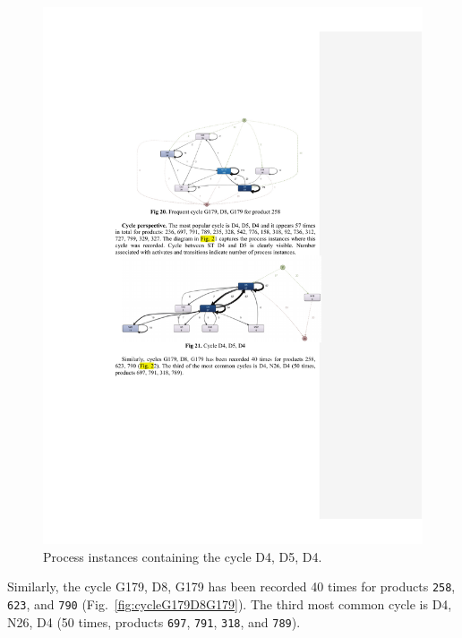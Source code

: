 \documentclass[lnbip]{svmultln}
\begin{document}
\begin{figure}
  \begin{center}
    \includegraphics[width=\textwidth]{"figs/pic 23"}
  \end{center}
  \caption{Process instances containing the cycle D4, D5, D4.}
  \label{fig:cycleD4D5D4}
\end{figure}

Similarly, the cycle G179, D8, G179 has been recorded 40 times for products \texttt{258}, \texttt{623}, and \texttt{790} (Fig.~\ref{fig:cycleG179D8G179}). The third most common cycle is D4, N26, D4 (50 times, products \texttt{697}, \texttt{791}, \texttt{318}, and \texttt{789}).
 
\end{document}
